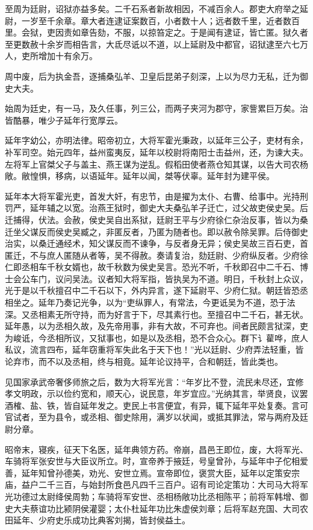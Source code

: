 \documentclass[]{article}
\begin{document}
至周为廷尉，诏狱亦益多矣。二千石系者新故相因，不减百余人。郡吏大府举之延尉，一岁至千余章。章大者连逮证案数百，小者数十人；远者数千里，近者数百里。会狱，吏因责如章告劾，不服，以掠笞定之。于是闻有逮证，皆亡匿。狱久者至更数赦十余岁而相告言，大氐尽诋以不道，以上延尉及中都官，诏狱逮至六七万人，吏所增加十有余万。

周中废，后为执金吾，逐捕桑弘羊、卫皇后昆弟子刻深，上以为尽力无私，迁为御史大夫。

始周为廷史，有一马，及久任事，列三公，而两子夹河为郡守，家訾累巨万矣。治皆酷暴，唯少子延年行宽厚云。

延年字幼公，亦明法律。昭帝初立，大将军霍光秉政，以延年三公子，吏材有余，补军司空。始元四年，益州蛮夷反，延年以校尉将南阳士击益州，还，为谏大夫。左将军上官桀父子与盖主、燕王谋为逆乱。假稻田使者燕仓知其谋，以告大司农杨敞。敝惶惧，移病，以语延年。延年以闻，桀等伏辜。延年封为建平侯。

延年本大将军霍光吏，首发大奸，有忠节，由是擢为太仆、右曹、给事中。光持刑罚严，延年辅之以宽。治燕王狱时，御史大夫桑弘羊子迁亡，过父故吏侯史吴。后迁捕得，伏法。会赦，侯史吴自出系狱，廷尉王平与少府徐仁杂治反事，皆以为桑迁坐父谋反而侯史吴臧之，非匿反者，乃匿为随者也。即以赦令除吴罪。后侍御史治实，以桑迁通经术，知父谋反而不谏争，与反者身无异；侯史吴故三百石吏，首匿迁，不与庶人匿随从者等，吴不得赦。奏请复治，劾廷尉、少府纵反者。少府徐仁即丞相车千秋女婿也，故千秋数为侯史吴言。恐光不听，千秋即召中二千石、博士会公车门，议问吴法。议者知大将军指，皆执吴为不道。明日，千秋封上众议，光于是以千秋擅召中二千石以下，外内异言，遂下延尉平、少府仁狱。朝廷皆恐丞相坐之。延年乃奏记光争，以为``吏纵罪人，有常法，今更诋吴为不道，恐于法深。又丞相素无所守持，而为好言于下，尽其素行也。至擅召中二千石，甚无状。延年愚，以为丞相久故，及先帝用事，非有大故，不可弃也。间者民颇言狱深，吏为峻诋，今丞相所议，又狱事也，如是以及丞相，恐不合众心。群下讠雚哗，庶人私议，流言四布，延年窃重将军失此名于天下也！''光以廷尉、少府弄法轻重，皆论弃市，而不以及丞相，终与相竟。延年论议持平，合和朝廷，皆此类也。

见国家承武帝奢侈师旅之后，数为大将军光言：``年岁比不登，流民未尽还，宜修孝文明政，示以俭约宽和，顺天心，说民意，年岁宜应。''光纳其言，举贤良，议罢酒榷、盐、铁，皆自延年发之。吏民上书言便宜，有异，辄下延年平处复奏。言可官试者，至为县令，或丞相、御史除用，满岁以状闻，或抵其罪法，常与两府及廷尉分章。

昭帝末，寝疾，征天下名医，延年典领方药。帝崩，昌邑王即位，废，大将军光、车骑将军张安世与大臣议所立。时，宣帝养于掖廷，号皇曾孙，与延年中子佗相爱善，延年知曾孙德美，劝光、安世立焉。宣帝即位，褒赏大臣，延年以定策安宗庙，益户二千三百，与始封所食邑凡四千三百户。诏有司论定策功：大司马大将军光功德过太尉绛侯周勃；车骑将军安世、丞相杨敞功比丞相陈平；前将军韩增、御史大夫蔡谊功比颍阴侯灌婴；太仆杜延年功比朱虚侯刘章；后将军赵充国、大司农田延年、少府史乐成功比典客刘揭，皆封侯益土。
\end{document}
